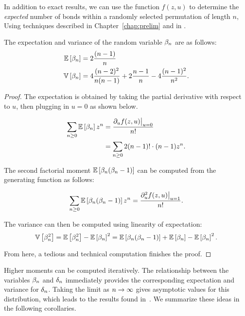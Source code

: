   In addition to exact results, we can use the function $f(z,u)$ to determine
  the \emph{expected}  number of bonds within a randomly
  selected permutation of length $n$, Using techniques described in
  Chapter~\ref{chap:prelim} and in \cite{flajolet}. 
  
  
  \begin{theorem} \label{fixpat:thm:exvar}
    The expectation and variance of the random variable $\beta_n$ are as
    follows:
    $$ \begin{aligned}
        \mathbb{E}\left[ \beta_n \right] &= 2\frac{(n-1)}{n} \\
        \mathbb{V}\left[ \beta_n \right] &= 4\frac{(n-2)^2}{n(n-1)} + 2\frac{n-1}{n} -
        4\frac{(n-1)^2}{n^2} . 
        \end{aligned} $$
  \end{theorem}
  \begin{proof}
    The expectation is obtained by taking the partial derivative with respect
    to $u$, then plugging in $u = 0$ as shown below. 

    $$ \begin{aligned}
      \sum_{n\geq 0}\mathbb{E}\left[ \beta_n \right]z^n 
        &= \frac{\partial_u f(z,u) \big|_{u=0}}{n!} \\
        &= \sum_{n \geq 0} 2 (n-1)! \cdot (n-1) z^n. 
      \end{aligned}$$
    
    The second factorial moment $\mathbb{E}\left[ \beta_n(\beta_n - 1) \right]$ can be computed from
    the generating function as follows:
    
    $$ \sum_{n \geq 0} \mathbb{E}\left[ \beta_n(\beta_n - 1) \right]z^n 
      = \frac{\partial_u^2 f(z,u) \big|_{u = 1}}{n!}.$$
    
    The variance can then be computed using linearity of expectation:
    $$ \mathbb{V}\left[ \beta_n^2 \right] = \mathbb{E}\left[ \beta_n^2 \right] - \mathbb{E}\left[ \beta_n \right]^2 
      = \mathbb{E}\left[ \beta_n(\beta_n - 1) \right] + \mathbb{E}\left[ \beta_n \right] - \mathbb{E}\left[ \beta_n \right]^2.$$
    
    From here, a tedious and technical computation finishes the proof. 
  \end{proof}

  Higher moments can be computed iteratively. 
  The relationship between the variables $\beta_n$ and $\delta_n$ immediately
  provides the corresponding expectation and variance for $\delta_n$. Taking the
  limit as $n \rightarrow \infty$ gives asymptotic values for this distribution,
  which leads to the results found in~\cite{Kaplansky, Wolfowitz}. We
  summarize these ideas in the following corollaries. 

